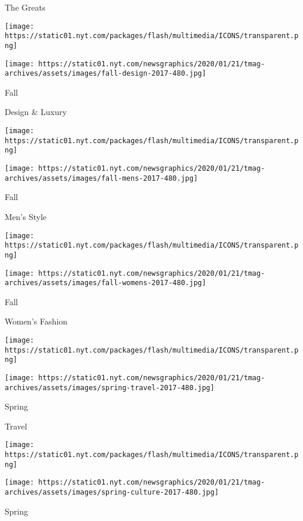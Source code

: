 The Greats

\href{https://www.nytimes.com/issue/t-magazine/2017/09/11/ts-sept-24-design-luxury-issue}{}

\texttt{[image: https://static01.nyt.com/packages/flash/multimedia/ICONS/transparent.png]}

\texttt{[image: https://static01.nyt.com/newsgraphics/2020/01/21/tmag-archives/assets/images/fall-design-2017-480.jpg]}

Fall

Design \& Luxury

\href{https://www.nytimes.com/issue/t-magazine/2017/09/05/ts-sept-10-mens-style-issue}{}

\texttt{[image: https://static01.nyt.com/packages/flash/multimedia/ICONS/transparent.png]}

\texttt{[image: https://static01.nyt.com/newsgraphics/2020/01/21/tmag-archives/assets/images/fall-mens-2017-480.jpg]}

Fall

Men's Style

\href{https://www.nytimes.com/issue/t-magazine/2017/08/11/ts-aug-20-womens-fashion-issue}{}

\texttt{[image: https://static01.nyt.com/packages/flash/multimedia/ICONS/transparent.png]}

\texttt{[image: https://static01.nyt.com/newsgraphics/2020/01/21/tmag-archives/assets/images/fall-womens-2017-480.jpg]}

Fall

Women's Fashion

\href{https://www.nytimes.com/issue/t-magazine/2017/05/08/ts-may-21-travel-issue-20170521}{}

\texttt{[image: https://static01.nyt.com/packages/flash/multimedia/ICONS/transparent.png]}

\texttt{[image: https://static01.nyt.com/newsgraphics/2020/01/21/tmag-archives/assets/images/spring-travel-2017-480.jpg]}

Spring

Travel

\href{https://www.nytimes.com/issue/t-magazine/2017/04/10/ts-april-23-culture-issue-20170423}{}

\texttt{[image: https://static01.nyt.com/packages/flash/multimedia/ICONS/transparent.png]}

\texttt{[image: https://static01.nyt.com/newsgraphics/2020/01/21/tmag-archives/assets/images/spring-culture-2017-480.jpg]}

Spring

